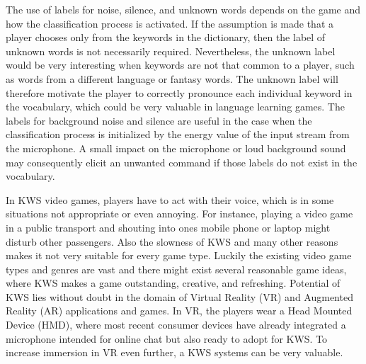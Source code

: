 The use of labels for noise, silence, and unknown words depends on the game and how the classification process is activated.
If the assumption is made that a player chooses only from the keywords in the dictionary, then the label of unknown words is not necessarily required.
Nevertheless, the unknown label would be very interesting when keywords are not that common to a player, such as words from a different language or fantasy words.
The unknown label will therefore motivate the player to correctly pronounce each individual keyword in the vocabulary, which could be very valuable in language learning games.
The labels for background noise and silence are useful in the case when the classification process is initialized by the energy value of the input stream from the microphone.
A small impact on the microphone or loud background sound may consequently elicit an unwanted command if those labels do not exist in the vocabulary.

In KWS video games, players have to act with their voice, which is in some situations not appropriate or even annoying.
For instance, playing a video game in a public transport and shouting into ones mobile phone or laptop might disturb other passengers.
Also the slowness of KWS and many other reasons makes it not very suitable for every game type.
Luckily the existing video game types and genres are vast and there might exist several reasonable game ideas, where KWS makes a game outstanding, creative, and refreshing.
Potential of KWS lies without doubt in the domain of Virtual Reality (VR) and Augmented Reality (AR) applications and games.
In VR, the players wear a Head Mounted Device (HMD), where most recent consumer devices have already integrated a microphone intended for online chat but also ready to adopt for KWS.
To increase immersion in VR even further, a KWS systems can be very valuable.